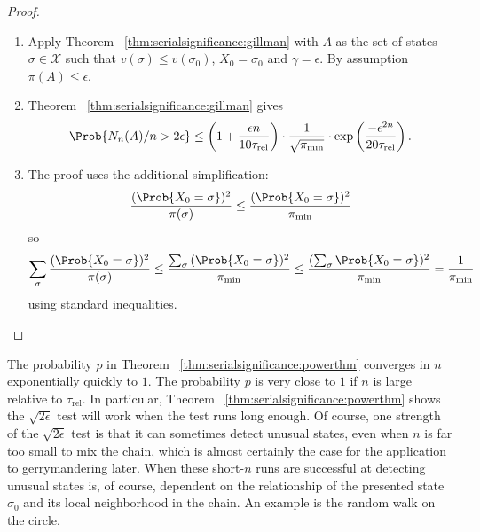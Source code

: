 \documentclass[12pt]{article}
\begin{document}
\begin{proof}
    \begin{enumerate}
        \item
            Apply Theorem~%
            \ref{thm:serialsignificance:gillman} with \( A \) as the set
            of states \( \sigma \in \mathcal{X} \) such that \( v(\sigma)
            \le v(\sigma_0) \), \( X_0 = \sigma_0 \) and \( \gamma =
            \epsilon \).  By assumption \( \pi(A) \le \epsilon \).
        \item
            Theorem~%
            \ref{thm:serialsignificance:gillman} gives
            \[
                \Prob{N_{n}(A)/n > 2\epsilon} \le \left( 1 + \frac{\epsilon
                n}{10 \tau_{\text{rel}}} \right) \cdot \frac{1}{\sqrt{\pi_
                {\min}}} \cdot \exp \left( \frac{-\epsilon^{2 n}}{20
                \tau_{\text{rel}}} \right).
            \]
        \item
            The proof uses the additional simplification:
            \[
                \frac{(\Prob{X_0 = \sigma})^2}{\pi (\sigma)} \le \frac{(\Prob
                {X_0 = \sigma})^2}{\pi_{\min}}
            \] so
            \[
                \sum_{\sigma} \frac{(\Prob{X_0 =\sigma})^2}{\pi (\sigma)}
                \le \frac{\sum_{\sigma}{(\Prob{X_0 =\sigma})^2}}{\pi_{\min}}
                \le \frac{(\sum_{\sigma}\Prob{X_0 =\sigma})^2}{\pi_{\min}}
                = \frac{1}{\pi_{\min}}
            \] using standard inequalities.
    \end{enumerate}
\end{proof}

\begin{remark}
    The probability \( p \) in Theorem~%
    \ref{thm:serialsignificance:powerthm} converges in \( n \)
    exponentially quickly to \( 1 \).  The probability \( p \) is very
    close to \( 1 \) if \( n \) is large relative to \( \tau_{\text {rel}}
    \).  In particular, Theorem~%
    \ref{thm:serialsignificance:powerthm} shows the \( \sqrt{2\epsilon} \)
    test will work when the test runs long enough.  Of course, one
    strength of the \( \sqrt{2\epsilon} \) test is that it can sometimes
    detect unusual states, even when \( n \) is far too small to mix the
    chain, which is almost certainly the case for the application to
    gerrymandering later.  When these short-\( n \) runs are successful
    at detecting unusual states is, of course, dependent on the
    relationship of the presented state \( \sigma_0 \) and its local
    neighborhood in the chain.  An example is the random walk on the
    circle.
\end{remark}
\end{document}
